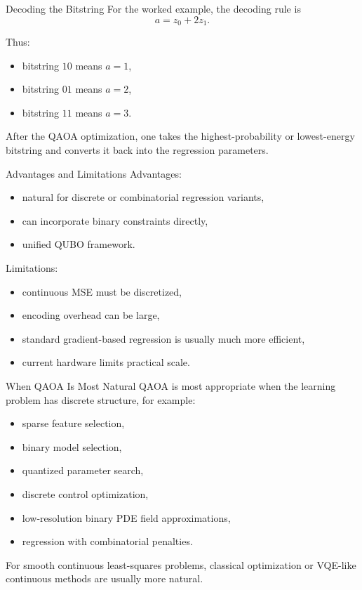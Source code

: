 \documentclass{beamer}
\begin{document}
\begin{frame}{Decoding the Bitstring}
For the worked example, the decoding rule is
\[
a=z_0+2z_1.
\]

Thus:
\begin{itemize}
\item bitstring \(10\) means \(a=1\),
\item bitstring \(01\) means \(a=2\),
\item bitstring \(11\) means \(a=3\).
\end{itemize}

After the QAOA optimization, one takes the highest-probability or lowest-energy bitstring and converts it back into the regression parameters.
\end{frame}

\begin{frame}{Advantages and Limitations}
Advantages:
\begin{itemize}
\item natural for discrete or combinatorial regression variants,
\item can incorporate binary constraints directly,
\item unified QUBO framework.
\end{itemize}

Limitations:
\begin{itemize}
\item continuous MSE must be discretized,
\item encoding overhead can be large,
\item standard gradient-based regression is usually much more efficient,
\item current hardware limits practical scale.
\end{itemize}
\end{frame}

\begin{frame}{When QAOA Is Most Natural}
QAOA is most appropriate when the learning problem has discrete structure, for example:
\begin{itemize}
\item sparse feature selection,
\item binary model selection,
\item quantized parameter search,
\item discrete control optimization,
\item low-resolution binary PDE field approximations,
\item regression with combinatorial penalties.
\end{itemize}

For smooth continuous least-squares problems, classical optimization or VQE-like continuous methods are usually more natural.
\end{frame}
\end{document}
